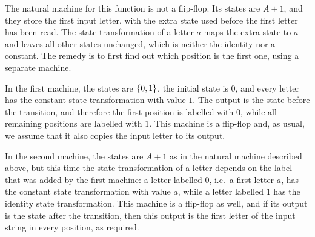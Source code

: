     {
    The natural machine for this function is not a flip-flop. Its states are $A+1$, and they store the first input letter, with the extra state used before the first letter has been read. The state transformation of a letter $a$ maps the extra state to $a$ and leaves all other states unchanged, which is neither the identity nor a constant. The remedy is to first find out which position is the first one, using a separate machine.

    In the first machine, the states are $\{0,1\}$, the initial state is $0$, and every letter has the constant state transformation with value $1$. The output is the state before the transition, and therefore the first position is labelled with $0$, while all remaining positions are labelled with $1$. This machine is a flip-flop and, as usual, we assume that it also copies the input letter to its output.

    In the second machine, the states are $A+1$ as in the natural machine described above, but this time the state transformation of a letter depends on the label that was added by the first machine: a letter labelled $0$, i.e.~a first letter $a$, has the constant state transformation with value $a$, while a letter labelled $1$ has the identity state transformation. This machine is a flip-flop as well, and if its output is the state after the transition, then this output is the first letter of the input string in every position, as required.
}



